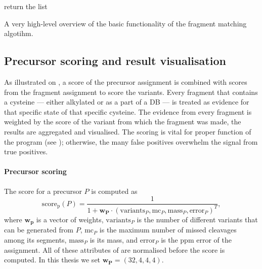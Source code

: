 \begin{algorithm}
\begin{algorithmic}

    \Else
    \label{alg:fragment:elongate}
    \EndIf
    \State return the list 
    \EndFunction
  \end{algorithmic}
  \caption{A very high-level overview of the basic functionality of the fragment matching algotihm.}\label{alg:fragment}
\end{algorithm}

\subsection{Precursor scoring and result visualisation}\label{sec:scoring}

As illustrated on , a score of the precursor assignment is combined with scores from the fragment assignment to score the variants. Every fragment that contains a cysteine --- either alkylated or as a part of a DB --- is treated as evidence for that specific state of that specific cysteine. The evidence from every fragment is weighted by the score of the variant from which the fragment was made, the results are aggregated and visualised. The scoring is vital for proper function of the program (see ); otherwise, the many false positives overwhelm the signal from true positives.

\paragraph{Precursor scoring} The score for a precursor \(P\) is computed as \[\operatorname{score_p}(P) = \frac{1}{1 + \bm{w_P} \cdot (\mathrm{variants}_P, \mathrm{mc}_P, \mathrm{mass}_P, \mathrm{error}_P)^T},\] where \(\bm{w_p}\) is a vector of weights, \(\mathrm{variants}_P\) is the number of different variants that can be generated from \(P\), \(\mathrm{mc}_P\) is the maximum number of missed cleavages among its segments, \(\mathrm{mass}_P\) is its mass, and \(\mathrm{error}_P\) is the ppm error of the assignment. All of these attributes of are normalised before the score is computed. In this thesis we set \(\bm{w_P} = (32, 4, 4, 4)\).

